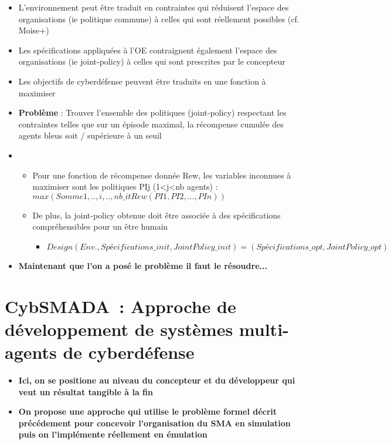 \begin{itemize}
    \item L'environnement peut être traduit en contraintes qui réduisent l'espace des organisations (ie politique commune) à celles qui sont réellement possibles (cf. Moise+)
    \item Les spécifications appliquées à l'OE contraignent également l'espace des organisations (ie joint-policy) à celles qui sont prescrites par le concepteur
    \item Les objectifs de cyberdéfense peuvent être traduits en une fonction à maximiser
    \item \textbf{Problème} : Trouver l'ensemble des politiques (joint-policy) respectant les contraintes telles que sur un épisode maximal, la récompense cumulée des agents bleus soit / supérieure à un seuil
    \item \begin{itemize}
              \item Pour une fonction de récompense donnée Rew, les variables inconnues à maximiser sont les politiques PIj (1<j<nb agents) :
                    $max (Somme{1, .., i, .., nb\_it} Rew(PI1, PI2, …, PIn))$
              \item De plus, la joint-policy obtenue doit être associée à des spécifications compréhensibles pour un être humain
                    \begin{itemize}
                        \item $Design(Env., Spécifications\_init, JointPolicy\_init) = (Spécifications\_opt, JointPolicy\_opt)$
                    \end{itemize}
          \end{itemize}
    \item \textbf{Maintenant que l'on a posé le problème il faut le résoudre...}
\end{itemize}

\section{CybSMADA : Approche de développement de systèmes multi-agents de cyberdéfense}\label{sec:cybSMAda}

\begin{itemize}
    \item \textbf{Ici, on se positione au niveau du concepteur et du développeur qui veut un résultat tangible à la fin}
    \item \textbf{On propose une approche qui utilise le problème formel décrit précédement pour concevoir l'organisation du SMA en simulation puis on l'implémente réellement en émulation}
\end{itemize}

